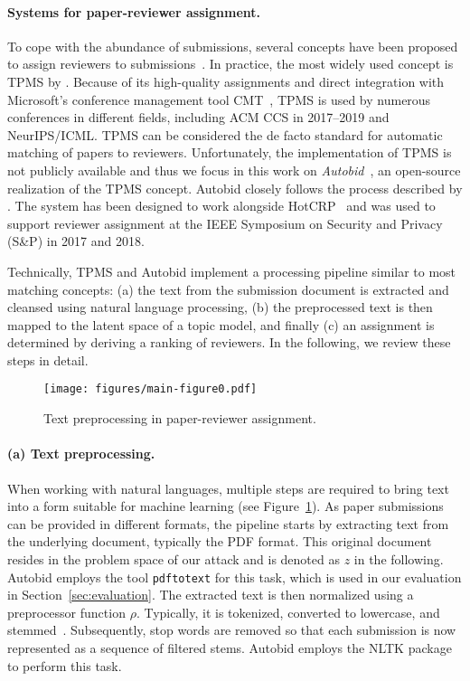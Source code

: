 \documentclass[letterpaper,twocolumn,10pt]{article}
\newcommand{\preprocessing}{\ensuremath{\rho}\xspace}
\newcommand{\inputpdf}{\ensuremath{z}\xspace}
\begin{document}
\paragraph{Systems for paper-reviewer assignment.} 
To cope with the abundance of submissions, several concepts have been proposed to assign reviewers to submissions~\citep[e.g.,][]{liu-14-robust, li-13-automatic, stelmakh-19-peerreview, long-13-good}. In practice, the most widely used concept is \ac{TPMS} by \citet{charlin-13-toronto}. Because of its high-quality assignments and direct integration with Microsoft's conference management tool CMT~\cite{misc-cmt}, \ac{TPMS} is used by numerous conferences in different fields, including ACM CCS in 2017--2019 and NeurIPS/ICML. \ac{TPMS} can be considered the de facto standard for automatic matching of papers to reviewers. Unfortunately, the implementation of \ac{TPMS} is not publicly available and thus we focus in this work on \emph{Autobid}~\cite{misc-autobid}, an open-source realization of the \ac{TPMS} concept. 
Autobid closely follows the process described by \citet{charlin-13-toronto}. The system has been designed to work {alongside\EndAccSupp{}} HotCRP~\cite{misc-hotcrp} and was used to support reviewer assignment at the IEEE Symposium on Security and Privacy (S\&P) in 2017 and 2018.

Technically, \ac{TPMS} and Autobid implement a processing pipeline similar to most matching concepts: (a) the text from the submission document is extracted and {cleansed\EndAccSupp{}} using natural language processing, (b) the preprocessed text is then mapped to the latent space of a topic model, and finally (c) an assignment is determined by deriving a ranking of reviewers. In the following, we review these steps in detail.

\begin{figure}[b]
    \centering
\texttt{[image: figures/main-figure0.pdf]}
    \caption{Text preprocessing in paper-reviewer assignment.}
    \label{fig:background_pipeline}
\end{figure}

\paragraph{(a) Text preprocessing.}
When working with natural languages, multiple steps are required to bring text into a form suitable for machine learning (see Figure~\ref{fig:background_pipeline}). 
As paper submissions can be provided in different formats, the pipeline starts by extracting text from the underlying document, typically the PDF format. This original document resides in the problem space of our attack and is denoted as \inputpdf in the following. Autobid employs the tool \texttt{pdftotext} for this task, which is used in our evaluation in Section~\ref{sec:evaluation}.
The extracted text is then normalized using a preprocessor function \preprocessing. Typically, it is tokenized, converted to {lowercase\EndAccSupp{}}, and stemmed~\cite{lovins-68-development}. Subsequently, stop words are removed so that each submission is now represented as a sequence of filtered stems. Autobid employs the NLTK package \citep{bird-09-natural} to perform this task. 
\end{document}
